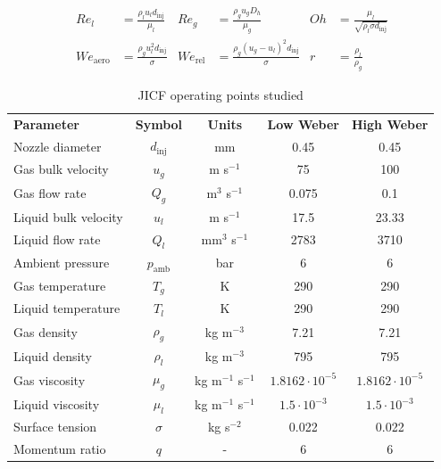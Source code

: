 \begin{equation}
\label{eq:dimensionless_numbers_jicf}
\begin{aligned}
Re_l &= \frac{\rho_l u_l d_\mathrm{inj}}{\mu_l}          &  Re_g &= \frac{\rho_g u_g D_h}{\mu_g}              &  Oh &=  \frac{\mu_l}{\sqrt{\rho_l \sigma d_\mathrm{inj}}}\\
We_\mathrm{aero} &= \frac{\rho_g u_l^2 d_\mathrm{inj}}{\sigma}    &  We_\mathrm{rel} &= \frac{\rho_g \left( u_g - u_l \right)^2 d_\mathrm{inj}}{\sigma}          & r &= \frac{\rho_l}{\rho_g} 
\end{aligned}
\end{equation}


\begin{table}[!h]
\centering
\caption{JICF operating points studied}
\begin{tabular}{lcccc}
\thickhline
\textbf{Parameter} & \textbf{Symbol} & \textbf{Units} &  \textbf{Low Weber} &  \textbf{High Weber} \\ %
\thickhline
Nozzle diameter & $d_\mathrm{inj}$ & mm & 0.45 & 0.45 \\
Gas bulk velocity & $u_g$ & m s$^{-1}$ & 75 & 100 \\
Gas flow rate & $Q_g$ & m$^3$ s$^{-1}$ & 0.075  & 0.1 \\
Liquid bulk velocity & $u_l$ & m s$^{-1}$ & 17.5  & 23.33 \\
Liquid flow rate & $Q_l$ & mm$^3$ s$^{-1}$ & 2783  & 3710 \\
Ambient pressure & $p_\mathrm{amb}$ & bar &  6 & 6 \\
Gas temperature & $T_g$ & K & 290 & 290 \\
Liquid temperature & $T_l$ & K & 290 & 290 \\
Gas density & $\rho_g$ & kg m$^{-3}$ &  7.21 & 7.21 \\
Liquid density & $\rho_l$ & kg m$^{-3}$ &  795 & 795  \\
Gas viscosity & $\mu_g$ & kg m$^{-1}$ s$^{-1}$ & $1.8162 \cdot 10^{-5}$ &  $1.8162 \cdot 10^{-5}$  \\
Liquid viscosity & $\mu_l$ & kg m$^{-1}$ s$^{-1}$ & $1.5 \cdot 10^{-3}$ & $1.5 \cdot 10^{-3}$  \\
Surface tension & $\sigma$ & kg s$^{-2}$ &  0.022 & 0.022  \\
\thickhline
Momentum ratio & $q$ & - & 6 & 6 \\

\end{tabular}
\end{table}
